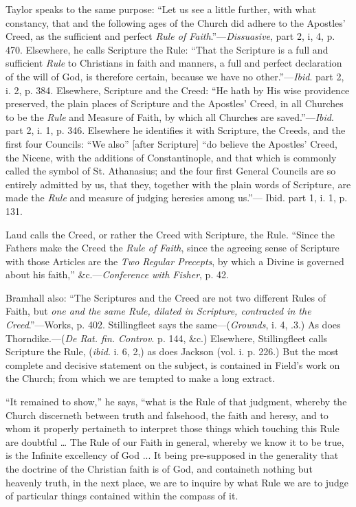 Taylor
speaks to the same purpose: ``Let us see a little further, with what
constancy, that and the following ages of the Church did adhere to the
Apostles' Creed, as the sufficient and perfect \emph{Rule of Faith}.''—\emph{Dissuasive},
part 2, i, 4, p. 470. Elsewhere, he calls Scripture the Rule: ``That
the Scripture is a full and sufficient \emph{Rule} to Christians in
faith and manners, a full and perfect declaration of the will of God, is
therefore certain, because we have no other.''—\emph{Ibid}. part 2, i.
2, p. 384. Elsewhere, Scripture and the Creed: ``He hath by His wise
providence preserved, the plain places of Scripture and the Apostles'
Creed, in all Churches to be the \emph{Rule} and Measure of Faith, by
which all Churches are saved.''—\emph{Ibid}. part 2, i. 1, p. 346.
Elsewhere he identifies it with Scripture, the Creeds, and the first
four Councils: ``We also'' [after Scripture] ``do believe the
Apostles' Creed, the Nicene, with the additions of Constantinople, and
that which is commonly called the symbol of St. Athanasius; and the four
first General Councils are so entirely admitted by us, that they,
together with the plain words of Scripture, are made the \emph{Rule} and
measure of judging heresies among us.''— Ibid. part 1, i. 1, p. 131.

Laud calls
the Creed, or rather the Creed with Scripture, the Rule. ``Since the
Fathers make the Creed the \emph{Rule of Faith}, since
the agreeing sense of Scripture with those Articles are the \emph{Two
Regular Precepts}, by which a Divine is governed about his faith,''
\&c.—\emph{Conference with Fisher}, p. 42.

Bramhall
also: ``The Scriptures and the Creed are not two different Rules of
Faith, but \emph{one and the same Rule, dilated in Scripture, contracted in
the Creed}.''—Works, p. 402. Stillingfleet says the same—(\emph{Grounds},
i. 4, .3.) As does Thorndike.—(\emph{De Rat. fin. Controv}. p. 144,
\&c.) Elsewhere, Stillingfleet calls Scripture the Rule, (\emph{ibid}.
i. 6, 2,) as does Jackson (vol. i. p. 226.) But the most complete and
decisive statement on the subject, is contained in Field's work on the
Church; from which we are tempted to make a long extract.

``It
remained to show,'' he says, ``what is the Rule of that judgment,
whereby the Church discerneth between truth and falsehood, the faith and
heresy, and to whom it properly pertaineth to interpret those things
which touching this Rule are doubtful … The Rule of our Faith in
general, whereby we know it to be true, is the Infinite excellency of
God ... It being pre-supposed in the generality that the doctrine of the
Christian faith is of God, and containeth nothing but heavenly truth, in
the next place, we are to inquire by what Rule we are to judge of
particular things contained within the compass of it.

